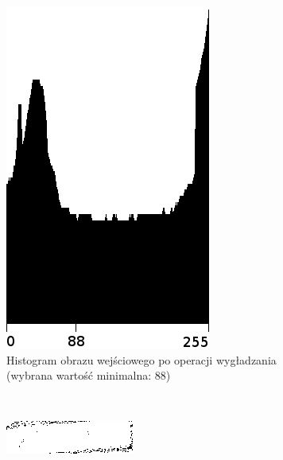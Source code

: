 \begin{figure}
\begin{subfigure}[b]{0.45\textwidth}
    \includegraphics[width=\textwidth]{img/research-min-histogram-good-histogram}
    \caption{Histogram obrazu wejściowego po operacji wygładzania (wybrana wartość minimalna: 88)}
    \label{fig:research_min_histogram_good_histogram}
  \end{subfigure}
  ~
  \begin{subfigure}[b]{0.45\textwidth}
    \includegraphics[width=\textwidth]{img/research-min-histogram-bad-output}

\end{subfigure}
\end{figure}
